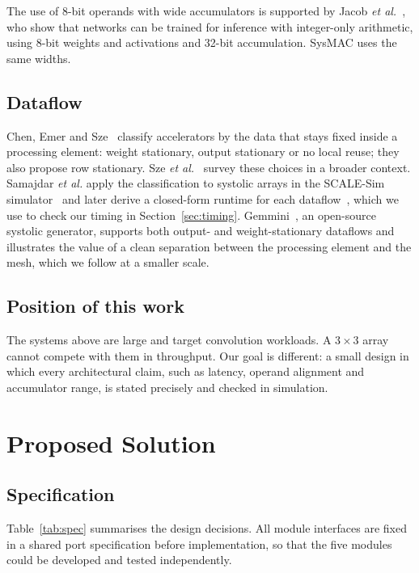 \documentclass[conference]{IEEEtran}
\begin{document}
The use of 8-bit operands with wide accumulators is supported by Jacob \emph{et al.}~\cite{jacob2018}, who show that networks can be trained for inference with integer-only arithmetic, using 8-bit weights and activations and 32-bit accumulation. SysMAC uses the same widths.

\subsection{Dataflow}
Chen, Emer and Sze~\cite{eyeriss2016} classify accelerators by the data that stays fixed inside a processing element: weight stationary, output stationary or no local reuse; they also propose row stationary. Sze \emph{et al.}~\cite{sze2017} survey these choices in a broader context. Samajdar \emph{et al.} apply the classification to systolic arrays in the SCALE-Sim simulator~\cite{scalesim2018} and later derive a closed-form runtime for each dataflow~\cite{scalesim2020}, which we use to check our timing in Section~\ref{sec:timing}. Gemmini~\cite{gemmini2021}, an open-source systolic generator, supports both output- and weight-stationary dataflows and illustrates the value of a clean separation between the processing element and the mesh, which we follow at a smaller scale.

\subsection{Position of this work}
The systems above are large and target convolution workloads. A $3 \times 3$ array cannot compete with them in throughput. Our goal is different: a small design in which every architectural claim, such as latency, operand alignment and accumulator range, is stated precisely and checked in simulation.

\section{Proposed Solution}
\label{sec:design}

\subsection{Specification}
Table~\ref{tab:spec} summarises the design decisions. All module interfaces are fixed in a shared port specification before implementation, so that the five modules could be developed and tested independently.
\end{document}
